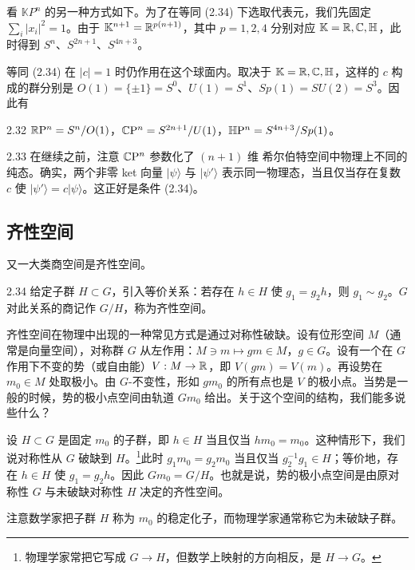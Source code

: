 看 $\mathbb{K}P^n$ 的另一种方式如下。为了在等同 (2.34) 下选取代表元，我们先固定 $\sum_i|x_i|^2=1$。由于 $\mathbb{K}^{n+1}=\mathbb{R}^{p(n+1)}$，其中 $p=1,2,4$ 分别对应 $\mathbb{K}=\mathbb{R},\mathbb{C},\mathbb{H}$，此时得到 $S^n$、$S^{2n+1}$、$S^{4n+3}$。

等同 (2.34) 在 $|c|=1$ 时仍作用在这个球面内。取决于 $\mathbb{K}=\mathbb{R},\mathbb{C},\mathbb{H}$，这样的 $c$ 构成的群分别是 $O(1)=\{\pm1\}=S^0$、$U(1)=S^1$、$Sp(1)=SU(2)=S^3$。因此有

\begin{proposition}{2.32}
$\mathbb{R}\mathrm{P}^n=S^n/O(1)$，$\mathbb{C}\mathrm{P}^n=S^{2n+1}/U(1)$，$\mathbb{H}\mathrm{P}^n=S^{4n+3}/Sp(1)$。
\end{proposition}

\begin{remark}{2.33}
在继续之前，注意 $\mathbb{C}\mathrm{P}^n$ 参数化了 $(n+1)$ 维 希尔伯特空间中物理上不同的纯态。确实，两个非零 ket 向量 $|\psi\rangle$ 与 $|\psi'\rangle$ 表示同一物理态，当且仅当存在复数 $c$ 使 $|\psi'\rangle=c|\psi\rangle$。这正好是条件 (2.34)。
\end{remark}

\subsection{齐性空间}

又一大类商空间是齐性空间。

\begin{definition}{2.34}
给定子群 $H\subset G$，引入等价关系：若存在 $h\in H$ 使 $g_1=g_2h$，则 $g_1\sim g_2$。$G$ 对此关系的商记作 $G/H$，称为齐性空间。
\end{definition}

齐性空间在物理中出现的一种常见方式是通过对称性破缺。设有位形空间 $M$（通常是向量空间），对称群 $G$ 从左作用：$M\ni m\mapsto gm\in M$，$g\in G$。设有一个在 $G$ 作用下不变的势（或自由能）$V:M\to\mathbb{R}$，即 $V(gm)=V(m)$。再设势在 $m_0\in M$ 处取极小。由 $G$-不变性，形如 $gm_0$ 的所有点也是 $V$ 的极小点。当势是一般的时候，势的极小点空间由轨道 $Gm_0$ 给出。关于这个空间的结构，我们能多说些什么？

设 $H\subset G$ 是固定 $m_0$ 的子群，即 $h\in H$ 当且仅当 $hm_0=m_0$。这种情形下，我们说对称性从 $G$ 破缺到 $H$。\footnote{物理学家常把它写成 $G\to H$，但数学上映射的方向相反，是 $H\to G$。}此时 $g_1m_0=g_2m_0$ 当且仅当 $g_2^{-1}g_1\in H$；等价地，存在 $h\in H$ 使 $g_1=g_2h$。因此 $Gm_0=G/H$。也就是说，势的极小点空间是由原对称性 $G$ 与未破缺对称性 $H$ 决定的齐性空间。

注意数学家把子群 $H$ 称为 $m_0$ 的稳定化子，而物理学家通常称它为未破缺子群。

